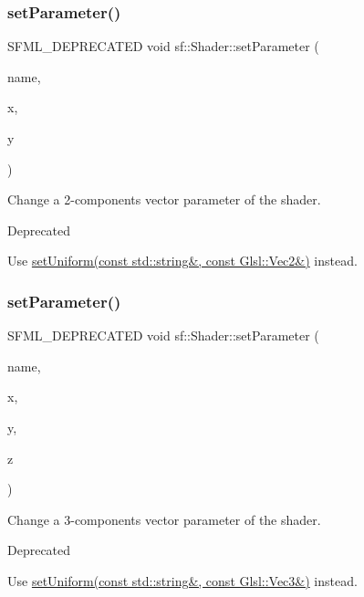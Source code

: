 \subsubsection{\texorpdfstring{set\+Parameter()}{setParameter()}\hspace{0.1cm}{\footnotesize\ttfamily [2/10]}}
{\footnotesize\ttfamily S\+F\+M\+L\+\_\+\+D\+E\+P\+R\+E\+C\+A\+T\+ED void sf\+::\+Shader\+::set\+Parameter (\begin{DoxyParamCaption}\item[{const std\+::string \&}]{name,  }\item[{float}]{x,  }\item[{float}]{y }\end{DoxyParamCaption})}



Change a 2-\/components vector parameter of the shader. 

\begin{DoxyRefDesc}{Deprecated}
\item[\hyperlink{deprecated__deprecated000008}{Deprecated}]Use \hyperlink{classsf_1_1_shader_a4a2c673c41e37b17d67e4af1298b679f}{set\+Uniform(const std\+::string\&, const Glsl\+::\+Vec2\&)} instead.\end{DoxyRefDesc}
\mbox{\label{classsf_1_1_shader_a1fa0fb11cabd8553ccd37e97c725c992}} 
\subsubsection{\texorpdfstring{set\+Parameter()}{setParameter()}\hspace{0.1cm}{\footnotesize\ttfamily [3/10]}}
{\footnotesize\ttfamily S\+F\+M\+L\+\_\+\+D\+E\+P\+R\+E\+C\+A\+T\+ED void sf\+::\+Shader\+::set\+Parameter (\begin{DoxyParamCaption}\item[{const std\+::string \&}]{name,  }\item[{float}]{x,  }\item[{float}]{y,  }\item[{float}]{z }\end{DoxyParamCaption})}



Change a 3-\/components vector parameter of the shader. 

\begin{DoxyRefDesc}{Deprecated}
\item[\hyperlink{deprecated__deprecated000009}{Deprecated}]Use \hyperlink{classsf_1_1_shader_aad654ad8de6f0c56191fa7b8cea21db2}{set\+Uniform(const std\+::string\&, const Glsl\+::\+Vec3\&)} instead.\end{DoxyRefDesc}
\mbox{\label{classsf_1_1_shader_a6d6b84575a5f1a869d70a126df8d6478}} 
